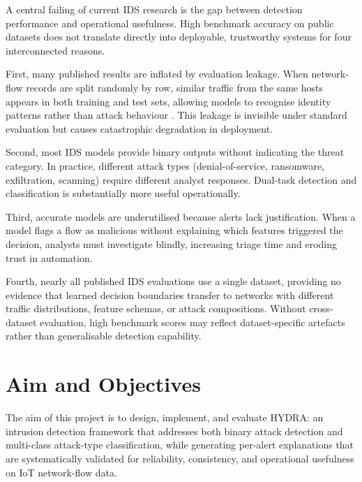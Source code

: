 \documentclass[12pt,a4paper]{report}
\begin{document}
A central failing of current IDS research is the gap between detection performance and operational usefulness. High benchmark accuracy on public datasets does not translate directly into deployable, trustworthy systems for four interconnected reasons.

First, many published results are inflated by evaluation leakage. When network-flow records are split randomly by row, similar traffic from the same hosts appears in both training and test sets, allowing models to recognise identity patterns rather than attack behaviour \cite{turcotte2018}. This leakage is invisible under standard evaluation but causes catastrophic degradation in deployment.

Second, most IDS models provide binary outputs without indicating the threat category. In practice, different attack types (denial-of-service, ransomware, exfiltration, scanning) require different analyst responses. Dual-task detection and classification is substantially more useful operationally.

Third, accurate models are underutilised because alerts lack justification. When a model flags a flow as malicious without explaining which features triggered the decision, analysts must investigate blindly, increasing triage time and eroding trust in automation.

Fourth, nearly all published IDS evaluations use a single dataset, providing no evidence that learned decision boundaries transfer to networks with different traffic distributions, feature schemas, or attack compositions. Without cross-dataset evaluation, high benchmark scores may reflect dataset-specific artefacts rather than generalisable detection capability.

\section{Aim and Objectives}
\label{sec:aim}

The aim of this project is to design, implement, and evaluate HYDRA: an intrusion detection framework that addresses both binary attack detection and multi-class attack-type classification, while generating per-alert explanations that are systematically validated for reliability, consistency, and operational usefulness on IoT network-flow data.
\end{document}
